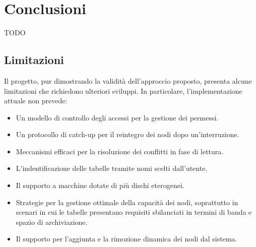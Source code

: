 \section{Conclusioni}
\label{sec:conclusioni}


TODO

\subsection{Limitazioni}
\label{subsec:limitazioni}

Il progetto, pur dimostrando la validità dell'approccio proposto, presenta alcune limitazioni che richiedono ulteriori sviluppi. In particolare, l'implementazione attuale non prevede:

\begin{itemize}
    \item Un modello di controllo degli accessi per la gestione dei permessi.
    \item Un protocollo di catch-up per il reintegro dei nodi dopo un'interruzione.
    \item Meccanismi efficaci per la risoluzione dei conflitti in fase di lettura.
    \item L'indentificazione delle tabelle tramite nomi scelti dall'utente.
    \item Il supporto a macchine dotate di più dischi eterogenei.
    \item Strategie per la gestione ottimale della capacità dei nodi, soprattutto in scenari in cui le tabelle presentano requisiti sbilanciati in termini di banda e spazio di archiviazione.
    \item Il supporto per l'aggiunta e la rimozione dinamica dei nodi dal sistema.
\end{itemize}
